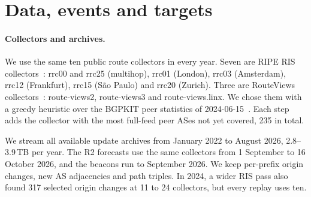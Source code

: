 \section{Data, events and targets}\label{sec:data}

\paragraph{Collectors and archives.}
We use the same ten public route collectors in every year.
Seven are RIPE RIS collectors~\cite{ripe_ris}: rrc00 and rrc25 (multihop), rrc01 (London), rrc03 (Amsterdam), rrc12 (Frankfurt), rrc15 (S\~ao Paulo) and rrc20 (Zurich).
Three are RouteViews collectors~\cite{routeviews}: route-views2, route-views3 and route-views.linx.
We chose them with a greedy heuristic over the BGPKIT peer statistics of 2024-06-15~\cite{bgpkit}.
Each step adds the collector with the most full-feed peer ASes not yet covered, 235 in total.

We stream all available update archives from January 2022 to August 2026, 2.8--3.9\,TB per year.
The R2 forecasts use the same collectors from 1 September to 16 October 2026, and the beacons run to September 2026.
We keep per-prefix origin changes, new AS adjacencies and path triples.
In 2024, a wider RIS pass also found 317 selected origin changes at 11 to 24 collectors, but every replay uses ten.

